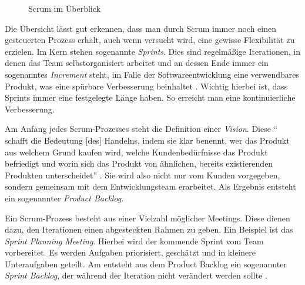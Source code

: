 \begin{figure}[H]
	\centering
	\caption[Scrum im Überblick]{Scrum im Überblick \protect \cite[S. 29]{wirdemann_scrum_2017}}
	\label{fig:scrum}
\end{figure}

Die Übersicht lässt gut erkennen, dass man durch Scrum immer noch einen gesteuerten Prozess erhält, auch wenn versucht wird, eine gewisse  Flexibilität zu erzielen. Im Kern stehen sogenannte \textit{Sprints}. Dies sind regelmäßige Iterationen, in denen das Team selbstorganisiert arbeitet und an dessen Ende immer ein sogenanntes \textit{Increment} steht, im Falle der Softwareentwicklung eine verwendbares Produkt, was eine spürbare  Verbesserung beinhaltet \cite[S. 30]{wirdemann_scrum_2017}. Wichtig hierbei ist, dass Sprints immer eine festgelegte Länge haben. So erreicht man eine kontinuierliche Verbesserung.

Am Anfang jedes  Scrum-Prozesses steht die Definition einer \textit{Vision}. Diese `` schafft die Bedeutung [des] Handelns, indem sie klar benennt, wer das Produkt aus welchem Grund kaufen wird, welche Kundenbedürfnisse das Produkt befriedigt und worin sich das Produkt von ähnlichen, bereits existierenden Produkten unterscheidet'' \cite[S. 29]{wirdemann_scrum_2017}. Sie wird also nicht nur vom Kunden vorgegeben, sondern gemeinsam mit dem Entwicklungsteam erarbeitet. Als Ergebnis entsteht ein sogenannter \textit{Product Backlog}.

Ein Scrum-Prozess besteht aus einer Vielzahl möglicher Meetings. Diese dienen dazu, den Iterationen einen abgesteckten Rahmen zu geben. Ein Beispiel ist das \textit{Sprint Planning Meeting}. Hierbei wird der kommende Sprint vom Team vorbereitet. Es werden Aufgaben priorisiert, geschätzt und in kleinere Unteraufgaben geteilt. Am entsteht aus dem Product Backlog ein sogenannter \textit{Sprint Backlog}, der während der Iteration nicht verändert werden sollte \cite[S. 29]{wirdemann_scrum_2017}.

